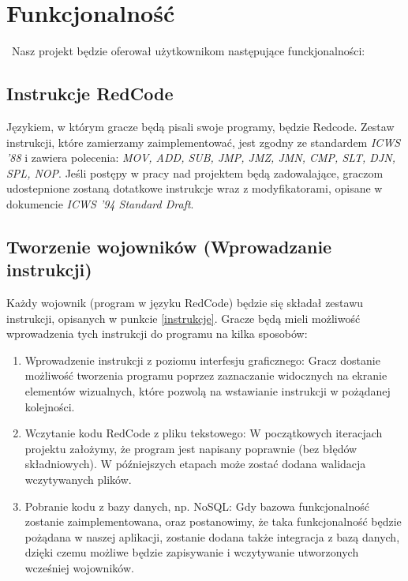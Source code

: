 {\let\clearpage\relax \chapter{Funkcjonalność}}
\
Nasz projekt będzie oferował użytkownikom następujące funckjonalności:

\section{Instrukcje RedCode}
Językiem, w którym gracze będą pisali swoje programy, będzie Redcode. Zestaw instrukcji, które zamierzamy zaimplementować, jest zgodny ze standardem \textit{ICWS '88} i zawiera polecenia: \textit{MOV, ADD, SUB, JMP, JMZ, JMN, CMP, SLT, DJN, SPL, NOP}. Jeśli postępy w pracy nad projektem będą zadowalające, graczom udostepnione zostaną dotatkowe instrukcje wraz z modyfikatorami, opisane w dokumencie \textit{ICWS '94 Standard Draft}.
\label{instrukcje}
\section{Tworzenie wojowników (Wprowadzanie instrukcji)}
Każdy wojownik (program w języku RedCode) będzie się składał zestawu instrukcji, opisanych w punkcie \ref{instrukcje}. Gracze będą mieli możliwość wprowadzenia tych instrukcji do programu na kilka sposobów:
\begin{enumerate}
	\item Wprowadzenie instrukcji z poziomu interfesju graficznego:
	\newline
	Gracz dostanie możliwość tworzenia programu poprzez zaznaczanie widocznych na ekranie elementów wizualnych, które pozwolą na wstawianie instrukcji w pożądanej kolejności.
	
	\item Wczytanie kodu RedCode z pliku tekstowego:
	\newline
	W początkowych iteracjach projektu założymy, że program jest napisany poprawnie (bez błędów składniowych). W późniejszych etapach może zostać dodana walidacja wczytywanych plików.

	\item Pobranie kodu z bazy danych, np. NoSQL:
	\newline
	Gdy bazowa funkcjonalność zostanie zaimplementowana, oraz postanowimy, że taka funkcjonalność będzie pożądana w naszej aplikacji, zostanie dodana także integracja z bazą danych, dzięki czemu możliwe będzie zapisywanie i wczytywanie utworzonych wcześniej wojowników.

\end{enumerate}

